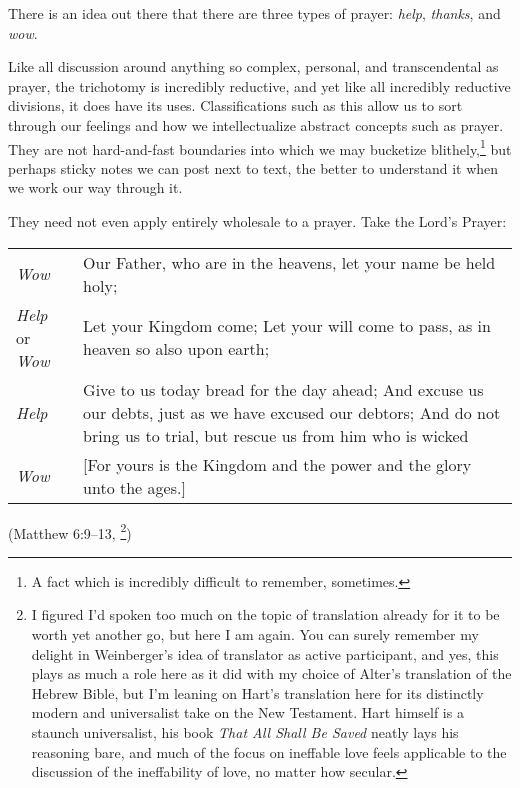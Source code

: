 There is an idea out there that there are three types of prayer: \emph{help}, \emph{thanks}, and \emph{wow}. \parencite{helpthankswow}

Like all discussion around anything so complex, personal, and transcendental as prayer, the trichotomy is incredibly reductive, and yet like all incredibly reductive divisions, it does have its uses. Classifications such as this allow us to sort through our feelings and how we intellectualize abstract concepts such as prayer. They are not hard-and-fast boundaries into which we may bucketize blithely,\footnote{A fact which is incredibly difficult to remember, sometimes.} but perhaps sticky notes we can post next to text, the better to understand it when we work our way through it.

They need not even apply entirely wholesale to a prayer. Take the Lord's Prayer:

\newlength{\tRemainder}
\noindent\begin{tabular}{@{}>{\raggedleft\arraybackslash}p{}|p{\tRemainder}}
\emph{Wow} &
Our Father, who are in the heavens, let your name be held holy; \\
\emph{Help} or \emph{Wow} &
Let your Kingdom come; Let your will come to pass, as in heaven so also upon earth; \\
\emph{Help} &
Give to us today bread for the day ahead; And excuse us our debts, just as we have excused our debtors; And do not bring us to trial, but rescue us from him who is wicked \\
\emph{Wow} &
{[}For yours is the Kingdom and the power and the glory unto the ages.{]}
\end{tabular}

\noindent(Matthew 6:9--13, \cite[10]{dbh-nt}\footnote{I figured I'd spoken too much on the topic of translation already for it to be worth yet another go, but here I am again. You can surely remember my delight in Weinberger's idea of translator as active participant, and yes, this plays as much a role here as it did with my choice of Alter's translation of the Hebrew Bible, but I'm leaning on Hart's translation here for its distinctly modern and universalist take on the New Testament. Hart himself is a staunch universalist, his book \emph{That All Shall Be Saved} neatly lays his reasoning bare, and much of the focus on ineffable love feels applicable to the discussion of the ineffability of love, no matter how secular.})


